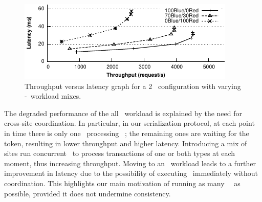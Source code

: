 
\begin{figure}[t]
  \centering
\includegraphics[width=0.85\columnwidth]{figures/redblue/thla2dcredblue.pdf}
  \caption{ Throughput versus latency graph for a 2 \dc\ configuration with
    varying \red-\blue\ workload mixes.}
 \label{fig:micro2dcoverall1}
\end{figure}

The degraded performance of the all \red\ workload is explained by
the need for cross-site coordination. In particular, in our
serialization protocol, at each point in time there is only one
\dc\ processing \red\ \transactions; the remaining ones are waiting
for the token, resulting in lower throughput and higher
latency. Introducing a mix of \blue\  sites run concurrent \dcs\ to
process transactions of one or both types at each moment, thus
increasing throughput. Moving to an \blue\ workload leads to a further
improvement in latency due to the possibility of executing
\transactions\ immediately without coordination. This highlights our
main motivation of running as many \blue\ \transactions\ as possible,
provided it does not undermine consistency.
\fi 

